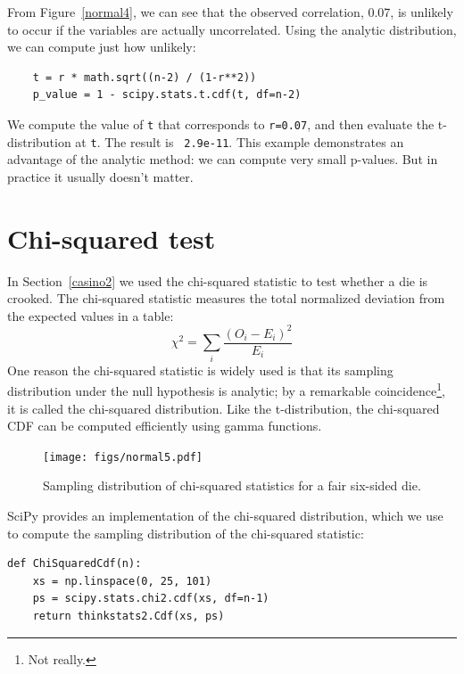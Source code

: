 \documentclass[12pt]{book}
\newcommand{\goodchi}{\chi}
\theoremstyle{exercise}
\begin{document}
From Figure~\ref{normal4}, we can see that the
observed correlation, 0.07, is unlikely to occur if the variables
are actually uncorrelated.
Using the analytic distribution, we can compute just how unlikely:%

\begin{verbatim}
    t = r * math.sqrt((n-2) / (1-r**2))
    p_value = 1 - scipy.stats.t.cdf(t, df=n-2)
\end{verbatim}

We compute the value of {\tt t} that corresponds to {\tt r=0.07}, and
then evaluate the t-distribution at {\tt t}.  The result is {\tt
  2.9e-11}.  This example demonstrates an advantage of the analytic
method: we can compute very small p-values.  But in practice it
usually doesn't matter.%
%


\section{Chi-squared test}

In Section~\ref{casino2} we used the chi-squared statistic to
test whether a die is crooked.  The chi-squared statistic measures
the total normalized deviation from the expected values in a table:
%
\[ \goodchi^2 = \sum_i \frac{{(O_i - E_i)}^2}{E_i} \]
%
One reason the chi-squared statistic is widely used is that
its sampling distribution under the null hypothesis is analytic;
by a remarkable coincidence\footnote{Not really.}, it is called
the chi-squared distribution.  Like the t-distribution, the
chi-squared CDF can be computed efficiently using gamma functions.%
%
%
%
%
%

\begin{figure}
\centerline{\texttt{[image: figs/normal5.pdf]}}
\caption{Sampling distribution of chi-squared statistics for
a fair six-sided die.}%
\label{normal5}
\end{figure}

SciPy provides an implementation of the chi-squared distribution,
which we use to compute the sampling distribution of the
chi-squared statistic:%

\begin{verbatim}
def ChiSquaredCdf(n):
    xs = np.linspace(0, 25, 101)
    ps = scipy.stats.chi2.cdf(xs, df=n-1)
    return thinkstats2.Cdf(xs, ps)
\end{verbatim}
\end{document}
